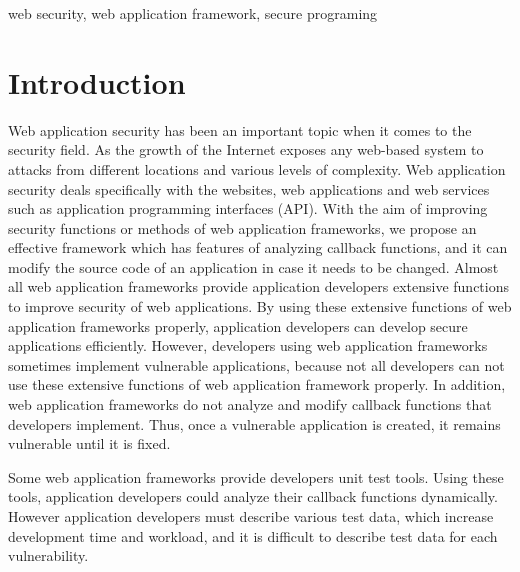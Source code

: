 \documentclass[conference]{IEEEtran}
\begin{document}
\begin{IEEEkeywords}
web security, web application framework, secure programing
\end{IEEEkeywords}

\section{Introduction}
Web application security has been an important topic when it comes to the security field.
As the growth of the Internet exposes any web-based system to attacks from different locations and various levels of complexity.
Web application security deals specifically with the websites, web applications and web services such as application programming interfaces (API).
With the aim of improving security functions or methods of web application frameworks, we propose an effective framework which has features of analyzing callback functions, and it can modify the source code of an application in case it needs to be changed.
Almost all web application frameworks provide application developers extensive functions to improve security of web applications.
By using these extensive functions of web application frameworks properly, application developers can develop secure applications efficiently.
However, developers using web application frameworks sometimes implement vulnerable applications, because not all developers can not use these extensive functions of web application framework properly.
In addition, web application frameworks do not analyze and modify callback functions that developers implement.
Thus, once a vulnerable application is created, it remains vulnerable until it is fixed.

Some web application frameworks provide developers unit test tools.
Using these tools, application developers could analyze their callback functions dynamically.
However application developers must describe various test data, which increase development time and workload, and it is difficult to describe test data for each vulnerability.
\end{document}
